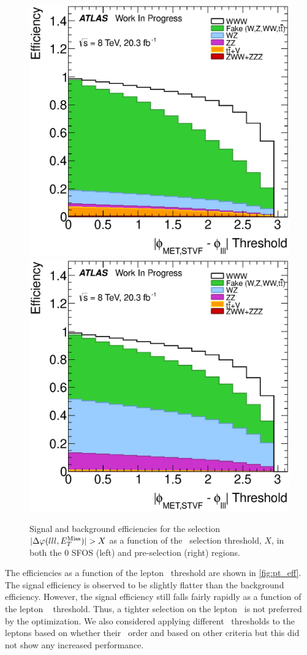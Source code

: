 \begin{figure}[ht!]
\centering
\includegraphics[width=0.45\columnwidth]{figures/optimization/SignalRegionsPreselection_0SFOS_Efficiencies/DeltaPhiMETSTVF123_Abs_Cumulative.eps}
\includegraphics[width=0.45\columnwidth]{figures/optimization/SignalRegions_0p5mmZ0_Preselection_Efficiencies/DeltaPhiMETSTVF123_Abs_Cumulative.eps}
\caption{ Signal and background efficiencies 
for the selection
$|\Delta\varphi(lll,E_{T}^{\textrm{Miss}})| > X$
as a function of the \deltaphi~selection
threshold, $X$, in both the 0 SFOS (left) and pre-selection (right) regions.  }
\label{fig:deltaphi_eff}
\end{figure}

The efficiencies as a function of the lepton \pt~threshold are shown 
in \fig\ref{fig:pt_eff}. 
The signal efficiency is observed to be slightly flatter
than the background efficiency.
However, the signal efficiency still falls fairly 
rapidly as a function of the lepton \pt~ threshold. 
Thus, a tighter selection on the lepton \pt~is not preferred
by the optimization. We also considered 
applying different \pt~thresholds to the leptons
based on whether their \pt~order and based on other criteria but
this did not show any increased performance.


